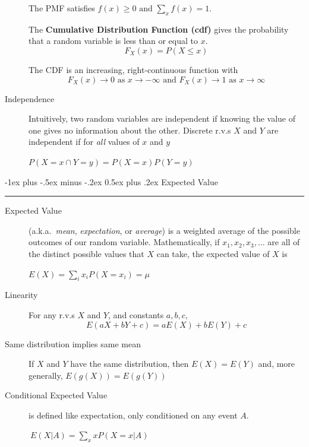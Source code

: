 \documentclass[10pt,landscape]{article}
\makeatletter
\renewcommand{\to}{\rightarrow}
\renewcommand{\section}{\@startsection{section}{1}{0mm}%
                                {-1ex plus -.5ex minus -.2ex}%
                                {0.5ex plus .2ex}%
                                {\normalfont\large\bfseries}}
\makeatother
\begin{document}
\begin{multicols*}{3}
\begin{description}
The PMF satisfies $f(x) \geq 0 \textrm{ and } \sum_x f(x) = 1 $.


The \textbf{Cumulative Distribution Function (cdf)} gives the probability that a random variable is less than or equal to $x$.
\[F_X(x) = P(X \leq x)\]


The CDF is an increasing, right-continuous function with
\[F_X(x) \to 0 \textrm{ as $x \to -\infty$ and } F_X(x) \to 1 \textrm{ as $x \to \infty$} \]
\item[Independence] Intuitively, two random variables are independent if knowing the value of one gives  no information about the other. Discrete r.v.s $X$ and $Y$ are independent if for \emph{all} values of $x$ and $y$  \begin{center}
$P(X=x \cap Y=y) = P(X = x)P(Y = y)$
\end{center}

\end{description}

\section{Expected Value} \hrule height 2pt 

\begin{description}
\item[Expected Value] (a.k.a.~\emph{mean}, \emph{expectation}, or \emph{average}) is a weighted average of the possible outcomes of our random variable. Mathematically, if $x_1, x_2, x_3, \dots$ are all of the distinct possible values that $X$ can take, the expected value of $X$ is
\begin{center}
$E(X) = \sum_{i} x_i P(X=x_i) = \mu$
\end{center}



\item[Linearity] For any r.v.s $X$ and $Y$, and constants $a,b,c,$ 
\[E(aX + bY + c) = aE(X) + bE(Y) + c \]

\item[Same distribution implies same mean] If $X$ and $Y$ have the same distribution, then $E(X)=E(Y)$ and, more generally, $E(g(X)) = E(g(Y))$


\item[Conditional Expected Value] is defined like expectation, only conditioned on any event $A$. \begin{center}
$\ E(X | A) = \sum_x x P(X=x | A)$
\end{center}


\end{description}
\end{multicols*}
\end{document}
